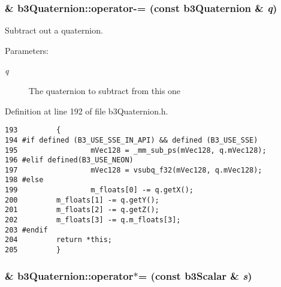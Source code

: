\hypertarget{classb3_quaternion_76087565cf44b29f38d8d2b5ac3cc268}{
\subsubsection[operator-=]{\& b3Quaternion::operator-= (const {\bf b3Quaternion} \& {\em q})}}
\label{classb3_quaternion_76087565cf44b29f38d8d2b5ac3cc268}


Subtract out a quaternion. 

\begin{Desc}
\item[Parameters:]
\begin{description}
\item[{\em q}]The quaternion to subtract from this one \end{description}
\end{Desc}


Definition at line 192 of file b3Quaternion.h.

\begin{Code}\begin{verbatim}193         {
194 #if defined (B3_USE_SSE_IN_API) && defined (B3_USE_SSE)
195                 mVec128 = _mm_sub_ps(mVec128, q.mVec128);
196 #elif defined(B3_USE_NEON)
197                 mVec128 = vsubq_f32(mVec128, q.mVec128);
198 #else   
199                 m_floats[0] -= q.getX(); 
200         m_floats[1] -= q.getY(); 
201         m_floats[2] -= q.getZ(); 
202         m_floats[3] -= q.m_floats[3];
203 #endif
204         return *this;
205         }
\end{verbatim}
\end{Code}


\hypertarget{classb3_quaternion_b21bc07cb139b5f1f604432666a28deb}{
\subsubsection[operator$\ast$=]{\& b3Quaternion::operator$\ast$= (const b3Scalar \& {\em s})}}
\label{classb3_quaternion_b21bc07cb139b5f1f604432666a28deb}


